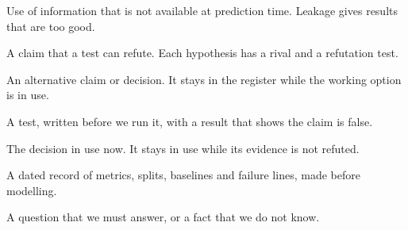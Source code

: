 \begin{description}[style=nextline,leftmargin=1.5em,font=\sffamily\bfseries]
  \item[Leakage] Use of information that is not available at prediction time. Leakage gives results that are too good.
  \item[Hypothesis] A claim that a test can refute. Each hypothesis has a rival and a refutation test.
  \item[Rival] An alternative claim or decision. It stays in the register while the working option is in use.
  \item[Refutation test] A test, written before we run it, with a result that shows the claim is false.
  \item[Working decision] The decision in use now. It stays in use while its evidence is not refuted.
  \item[Pre-registration] A dated record of metrics, splits, baselines and failure lines, made before modelling.
  \item[Gap] A question that we must answer, or a fact that we do not know.
\end{description}
\endgroup
